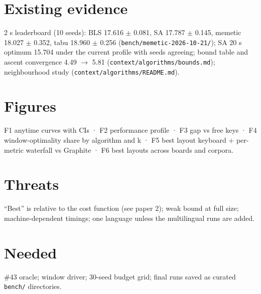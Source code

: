 \documentclass{gecko-paper}
\begin{document}
\begin{paperbody}
\section{Existing evidence}

2 s leaderboard (10 seeds): BLS 17.616 $\pm$ 0.081, SA 17.787 $\pm$ 0.145,
memetic 18.027 $\pm$ 0.352, tabu 18.960 $\pm$ 0.256
(\texttt{bench/memetic-2026-10-21/}); SA 20 s optimum 15.704 under the
current profile with seeds agreeing; bound table and ascent convergence
4.49 $\to$ 5.81 (\texttt{context/algorithms/bounds.md}); neighbourhood study
(\texttt{context/algorithms/README.md}).

\section{Figures}

F1 anytime curves with CIs · F2 performance profile · F3 gap vs free
keys · F4 window-optimality share by algorithm and k · F5 best layout
keyboard + per-metric waterfall vs Graphite · F6 best layouts across
boards and corpora.

\section{Threats}

“Best” is relative to the cost function (see paper 2); weak bound at
full size; machine-dependent timings; one language unless the
multilingual runs are added.

\section{Needed}

\#43 oracle; window driver; 30-seed budget grid; final runs saved as
curated \texttt{bench/} directories.

\end{paperbody}
\end{document}

